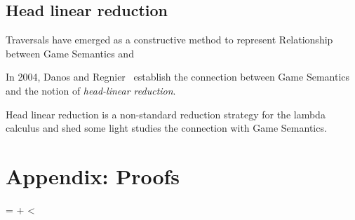 \documentclass{article}
\makeatletter
\newcounter{proofcount}
\def\printproofs{%
    \count@=\z@
    \loop
    \the\toks\numexpr\prooftoks+\count@\relax
    \ifnum\count@<\value{proofcount}%
    \advance\count@\@ne
    \repeat}
\theoremstyle{definition}
\makeatother
\begin{document}
\subsection{Head linear reduction}

Traversals have emerged as a constructive method to represent
Relationship between Game Semantics and

In 2004, Danos and Regnier~\cite{danos-head} establish the connection between Game Semantics and the notion of \emph{head-linear reduction}.

Head linear reduction is  a non-standard reduction strategy for the lambda calculus and shed some light studies the connection with Game Semantics.




\appendix

\section*{Appendix: Proofs}

\printproofs

%
\end{document}
